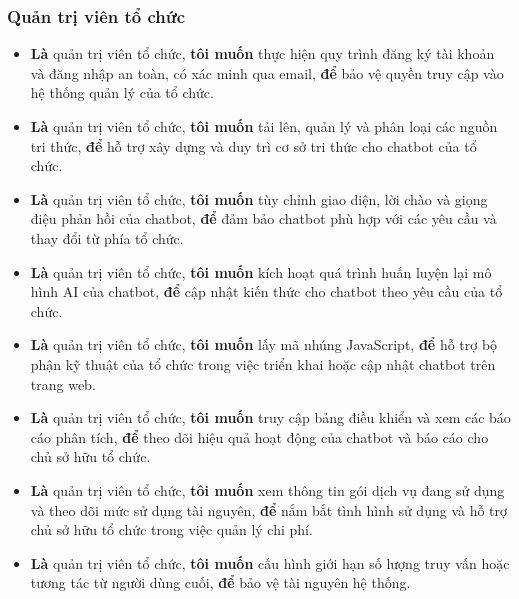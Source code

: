 \subsubsection{Quản trị viên tổ chức}
\begin{itemize}
    \item \textbf{Là} quản trị viên tổ chức, \textbf{tôi muốn} thực hiện quy trình đăng ký tài khoản và đăng nhập an toàn, có xác minh qua email, \textbf{để} bảo vệ quyền truy cập vào hệ thống quản lý của tổ chức.
    \item \textbf{Là} quản trị viên tổ chức, \textbf{tôi muốn} tải lên, quản lý và phân loại các nguồn tri thức, \textbf{để} hỗ trợ xây dựng và duy trì cơ sở tri thức cho chatbot của tổ chức.
    \item \textbf{Là} quản trị viên tổ chức, \textbf{tôi muốn} tùy chỉnh giao diện, lời chào và giọng điệu phản hồi của chatbot, \textbf{để} đảm bảo chatbot phù hợp với các yêu cầu và thay đổi từ phía tổ chức.
    \item \textbf{Là} quản trị viên tổ chức, \textbf{tôi muốn} kích hoạt quá trình huấn luyện lại mô hình AI của chatbot, \textbf{để} cập nhật kiến thức cho chatbot theo yêu cầu của tổ chức.
    \item \textbf{Là} quản trị viên tổ chức, \textbf{tôi muốn} lấy mã nhúng JavaScript, \textbf{để} hỗ trợ bộ phận kỹ thuật của tổ chức trong việc triển khai hoặc cập nhật chatbot trên trang web.
    \item \textbf{Là} quản trị viên tổ chức, \textbf{tôi muốn} truy cập bảng điều khiển và xem các báo cáo phân tích, \textbf{để} theo dõi hiệu quả hoạt động của chatbot và báo cáo cho chủ sở hữu tổ chức.
    \item \textbf{Là} quản trị viên tổ chức, \textbf{tôi muốn} xem thông tin gói dịch vụ đang sử dụng và theo dõi mức sử dụng tài nguyên, \textbf{để} nắm bắt tình hình sử dụng và hỗ trợ chủ sở hữu tổ chức trong việc quản lý chi phí.
    \item \textbf{Là} quản trị viên tổ chức, \textbf{tôi muốn} cấu hình giới hạn số lượng truy vấn hoặc tương tác từ người dùng cuối, \textbf{để} bảo vệ tài nguyên hệ thống.
\end{itemize}

